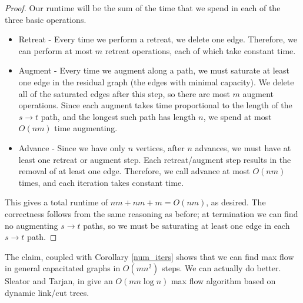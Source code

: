 \documentclass[11pt]{article}
\begin{document}
\begin{proof}
Our runtime will be the sum of the time that we spend in each of the three basic operations.

\begin{itemize}
\item Retreat - Every time we perform a retreat, we delete one edge. Therefore, we can perform at most $m$ retreat operations, each of which take constant time. 

\item Augment - 
Every time we augment along a path, we must saturate at least one edge in the residual graph (the edges with minimal capacity). We delete all of the saturated edges after this step, so there are most $m$ augment operations. Since each augment takes time proportional to the length of the $s \to t$ path, and the longest such path has length $n$, we spend at most $O(nm)$ time augmenting.

\item Advance - Since we have only $n$ vertices, after $n$ advances, we must have at least one retreat or augment step. Each retreat/augment step results in the removal of at least one edge. Therefore, we call advance at most $O(nm)$ times, and each iteration takes constant time. 

\end{itemize}
This gives a total runtime of $nm + nm + m = O(nm)$, as desired. The correctness follows from the same reasoning as before; at termination we can find no augmenting $s \to t$ paths, so we must be saturating at least one edge in each  $s \to t$ path. 
\end{proof}

The claim, coupled with Corollary \ref{num_iters} shows that we can find max flow in general capacitated graphs in $O(mn^2)$ steps. We can actually do better. Sleator and Tarjan, in \cite{linkcuttrees} give an $O(mn \log n)$ max flow algorithm based on dynamic link/cut trees. 


\end{document}
